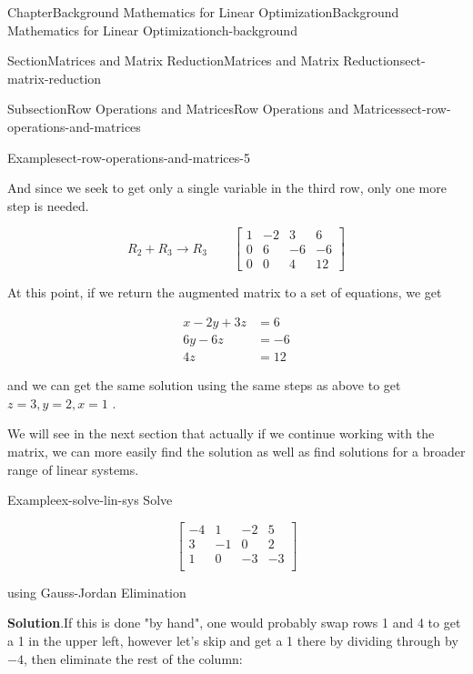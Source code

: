 \documentclass[oneside,10pt,]{book}
\newcommand{\blocktitlefont}{\relax}
\numberwithin{equation}{section}
\newcommand{\amp}{&}
\begin{document}
\begin{chapterptx}{Chapter}{Background Mathematics for Linear Optimization}{}{Background Mathematics for Linear Optimization}{}{}{ch-background}
\begin{sectionptx}{Section}{Matrices and Matrix Reduction}{}{Matrices and Matrix Reduction}{}{}{sect-matrix-reduction}
\begin{subsectionptx}{Subsection}{Row Operations and Matrices}{}{Row Operations and Matrices}{}{}{sect-row-operations-and-matrices}
\begin{example}{Example}{}{sect-row-operations-and-matrices-5}
\begin{equation*}
\end{equation*}
%
\par
And since we seek to get only a single variable in the third row, only one more step is needed.%
\par
%
\begin{equation*}
R_2 + R_3 \to R_3 \qquad \left[\begin{array}{rrr|r} 1 \amp -2 \amp 3 \amp 6 \\ 0 \amp 6 \amp -6 \amp -6 \\ 0 \amp 0 \amp 4 \amp 12 \end{array}\right]
\end{equation*}
%
\par
At this point, if we return the augmented matrix to a set of equations, we get%
\par
%
\begin{align*}
x - 2y + 3z \amp = 6 \\
6y - 6z \amp = -6\\
4z \amp = 12
\end{align*}
%
\par
and we can get the same solution using the same steps as above to get \(z=3, y=2, x=1\) .%
\end{example}
We will see in the next section that actually if we continue working with the matrix, we can more easily find the solution as well as find solutions for a broader range of linear systems.%
\begin{example}{Example}{}{ex-solve-lin-sys}%
Solve%
\par
%
\begin{equation}
\left[\begin{array}{rrr|r} -4 \amp 1 \amp -2 \amp 5\\ 3 \amp -1 \amp 0 \amp 2\\ 1 \amp 0 \amp -3 \amp -3\\ \end{array} \right]\label{eq-row-ops1}
\end{equation}
%
\par
using Gauss-Jordan Elimination%
\par\smallskip%
\noindent\textbf{\blocktitlefont Solution}.\hypertarget{ex-solve-lin-sys-2}{}\quad{}If this is done "by hand", one would probably swap rows 1 and 4 to get a 1 in the upper left, however let's skip and get a 1 there by dividing through by \(-4\), then eliminate the rest of the column:%
\par
%
\begin{equation*}

\end{equation*}
\end{example}
\end{subsectionptx}
\end{sectionptx}
\end{chapterptx}
\end{document}
